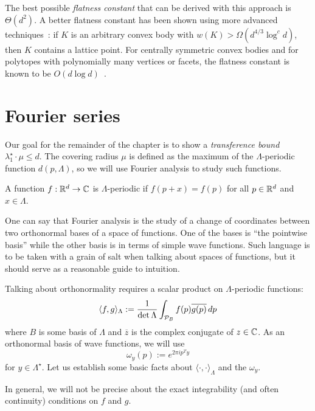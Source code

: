 The best possible \emph{flatness constant} that can be derived with this approach is $\Theta(d^2)$.
A better flatness constant has been shown using more advanced techniques~\cite{MR1854250, MR1755679}:
if $K$ is an arbitrary convex body with $w(K) > \Omega(d^{4/3} \log^c d)$,
then $K$ contains a lattice point.
For centrally symmetric convex bodies
and for polytopes with polynomially many vertices or facets,
the flatness constant is known to be $O(d \log d)$~\cite{MR1410163,MR1854250}.



\section{Fourier series}

Our goal for the remainder of the chapter is to show a \emph{transference bound}
$\lambda_1^\star \cdot \mu \leq d$.
The covering radius $\mu$ is defined as the maximum of the $\Lambda$-periodic function $d(p,\Lambda)$,
so we will use Fourier analysis to study such functions.

\begin{definition}
  A function $f: \mathbb{R}^d \to \mathbb{C}$ is $\Lambda$-periodic if $f(p + x) = f(p)$ for all $p \in \mathbb{R}^d$
  and $x \in \Lambda$.
\end{definition}

One can say that
Fourier analysis is the study of a change of coordinates between two orthonormal bases
of a space of functions.
One of the bases is ``the pointwise basis'' while the other basis is in terms of simple wave functions.
Such language is to be taken with a grain of salt when talking about spaces of functions,
but it should serve as a reasonable guide to intuition.

Talking about orthonormality requires a scalar product on $\Lambda$-periodic functions:
\[
  \langle f, g \rangle_\Lambda := \frac{1}{\det \Lambda} \int_{\mathcal{P}_B} f(p) \overline{g(p)} \,dp
\]
where $B$ is some basis of $\Lambda$ and $\overline{z}$ is the complex conjugate of $z \in \mathbb{C}$.
As an orthonormal basis of wave functions,
we will use
\[
  \omega_y(p) := e^{2\pi i p^T y}
\]
for $y \in \Lambda^\star$.
Let us establish some basic facts about $\langle \cdot, \cdot \rangle_\Lambda$ and the $\omega_y$.

\begin{remark}
  In general,
  we will not be precise about the exact integrability (and often continuity) conditions on $f$ and $g$.
\end{remark}

